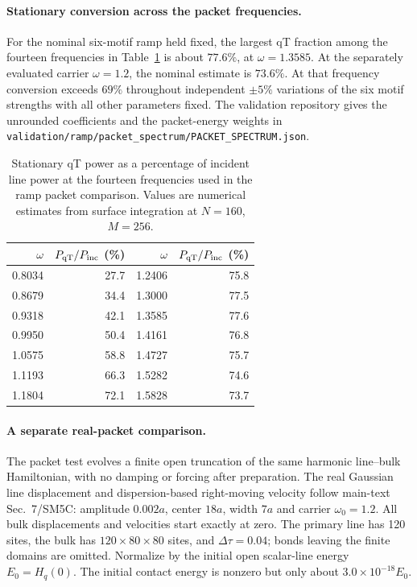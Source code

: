 \paragraph*{Stationary conversion across the packet frequencies.}
For the nominal six-motif ramp held fixed, the largest qT fraction among the fourteen frequencies in Table~\ref{tab:sm-ramp-frequency-samples} is about $77.6\%$, at $\omega=1.3585$. At the separately evaluated carrier $\omega=1.2$, the nominal estimate is $73.6\%$. At that frequency conversion exceeds $69\%$ throughout independent $\pm5\%$ variations of the six motif strengths with all other parameters fixed. The validation repository gives the unrounded coefficients and the packet-energy weights in \nolinkurl{validation/ramp/packet_spectrum/PACKET_SPECTRUM.json}.

\begin{table}[!htbp]
 \centering
 \caption{Stationary qT power as a percentage of incident line power at the fourteen frequencies used in the ramp packet comparison. Values are numerical estimates from surface integration at $N=160$, $M=256$.}
 \label{tab:sm-ramp-frequency-samples}
 \begin{tabular}{rr@{\qquad}rr}
  \toprule
  $\omega$ & $P_{\mathrm{qT}}/P_{\rm inc}$ (\%) & $\omega$ & $P_{\mathrm{qT}}/P_{\rm inc}$ (\%)\\
  \midrule
  0.8034 & 27.7 & 1.2406 & 75.8\\
  0.8679 & 34.4 & 1.3000 & 77.5\\
  0.9318 & 42.1 & 1.3585 & 77.6\\
  0.9950 & 50.4 & 1.4161 & 76.8\\
  1.0575 & 58.8 & 1.4727 & 75.7\\
  1.1193 & 66.3 & 1.5282 & 74.6\\
  1.1804 & 72.1 & 1.5828 & 73.7\\
  \bottomrule
 \end{tabular}
\end{table}

\paragraph*{A separate real-packet comparison.}
The packet test evolves a finite open truncation of the same harmonic line--bulk Hamiltonian, with no damping or forcing after preparation. The real Gaussian line displacement and dispersion-based right-moving velocity follow main-text Sec.~7/SM5C: amplitude $0.002a$, center $18a$, width $7a$ and carrier $\omega_0=1.2$. All bulk displacements and velocities start exactly at zero. The primary line has 120 sites, the bulk has $120\times80\times80$ sites, and $\Delta\tau=0.04$; bonds leaving the finite domains are omitted. Normalize by the initial open scalar-line energy $E_0=H_q(0)$. The initial contact energy is nonzero but only about $3.0\times10^{-18}E_0$.

